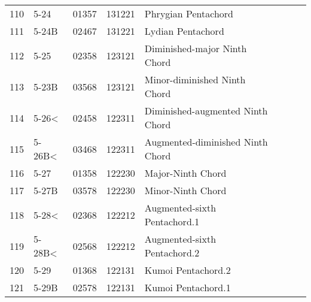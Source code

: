 \begin{table}[h]
\begin{tabular}{lllll}
110                    & 5-24                & 01357   & 131221    & Phrygian Pentachord                                        &                             &                   &      &     \\
111                    & 5-24B               & 02467   & 131221    & Lydian Pentachord                                          &                             &                   &      &     \\
112                    & 5-25                & 02358   & 123121    & Diminished-major Ninth Chord                               &                             &                   &      &     \\
113                    & 5-23B               & 03568   & 123121    & Minor-diminished Ninth Chord                               &                             &                   &      &     \\
114                    & 5-26\textless       & 02458   & 122311    & Diminished-augmented Ninth Chord                           &                             &                   &      &     \\
115                    & 5-26B\textless      & 03468   & 122311    & Augmented-diminished Ninth Chord                           &                             &                   &      &     \\
116                    & 5-27                & 01358   & 122230    & Major-Ninth Chord                                          &                             &                   &      &     \\
117                    & 5-27B               & 03578   & 122230    & Minor-Ninth Chord                                          &                             &                   &      &     \\
118                    & 5-28\textless       & 02368   & 122212    & Augmented-sixth Pentachord.1                               &                             &                   &      &     \\
119                    & 5-28B\textless      & 02568   & 122212    & Augmented-sixth Pentachord.2                               &                             &                   &      &     \\
120                    & 5-29                & 01368   & 122131    & Kumoi Pentachord.2                                         &                             &                   &      &     \\
121                    & 5-29B               & 02578   & 122131    & Kumoi Pentachord.1                                         &                             &                   &      &     \\

\end{tabular}
\end{table}
